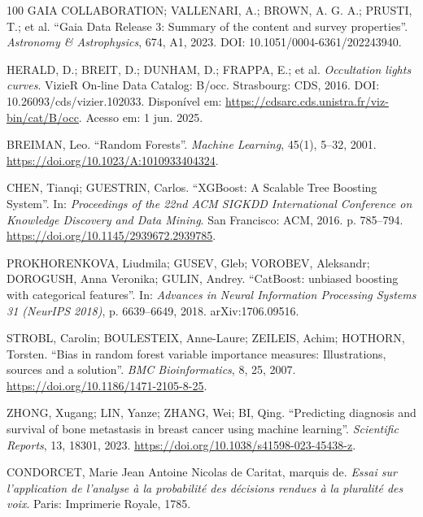 \documentclass[msc]{on} %
\begin{document}
\begin{thebibliography}{100}
 GAIA COLLABORATION; VALLENARI, A.; BROWN, A. G. A.; PRUSTI, T.; et al. ``Gaia Data Release 3: Summary of the content and survey properties''. \emph{Astronomy \& Astrophysics}, 674, A1, 2023. DOI: 10.1051/0004-6361/202243940.

 HERALD, D.; BREIT, D.; DUNHAM, D.; FRAPPA, E.; et al. \textit{Occultation lights curves}. VizieR On-line Data Catalog: B/occ. Strasbourg: CDS, 2016. DOI: 10.26093/cds/vizier.102033. Disponível em: \url{https://cdsarc.cds.unistra.fr/viz-bin/cat/B/occ}. Acesso em: 1 jun. 2025.

 BREIMAN, Leo. ``Random Forests''. \emph{Machine Learning}, 45(1), 5--32, 2001. \url{https://doi.org/10.1023/A:1010933404324}.

 CHEN, Tianqi; GUESTRIN, Carlos. ``XGBoost: A Scalable Tree Boosting System''. In: \emph{Proceedings of the 22nd ACM SIGKDD International Conference on Knowledge Discovery and Data Mining}. San Francisco: ACM, 2016. p. 785--794. \url{https://doi.org/10.1145/2939672.2939785}.

 PROKHORENKOVA, Liudmila; GUSEV, Gleb; VOROBEV, Aleksandr; DOROGUSH, Anna Veronika; GULIN, Andrey. ``CatBoost: unbiased boosting with categorical features''. In: \emph{Advances in Neural Information Processing Systems 31 (NeurIPS 2018)}, p. 6639--6649, 2018. arXiv:1706.09516.

 STROBL, Carolin; BOULESTEIX, Anne-Laure; ZEILEIS, Achim; HOTHORN, Torsten. ``Bias in random forest variable importance measures: Illustrations, sources and a solution''. \emph{BMC Bioinformatics}, 8, 25, 2007. \url{https://doi.org/10.1186/1471-2105-8-25}.

 ZHONG, Xugang; LIN, Yanze; ZHANG, Wei; BI, Qing. ``Predicting diagnosis and survival of bone metastasis in breast cancer using machine learning''. \emph{Scientific Reports}, 13, 18301, 2023. \url{https://doi.org/10.1038/s41598-023-45438-z}.

 CONDORCET, Marie Jean Antoine Nicolas de Caritat, marquis de. \textit{Essai sur l'application de l'analyse à la probabilité des décisions rendues à la pluralité des voix}. Paris: Imprimerie Royale, 1785.


\end{thebibliography}
\end{document}
